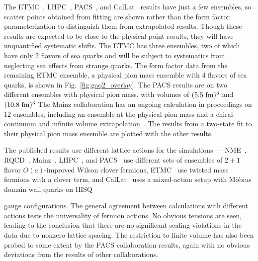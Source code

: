 The ETMC~\cite{Alexandrou:2020okk}, LHPC~\cite{Hasan:2017wwt},
 PACS~\cite{Ishikawa:2018rew,Shintani:2018ozy,Ishikawa:2021eut}, and CalLat~\cite{Meyer:2021vfq}
 results have just a few ensembles, so scatter points obtained from fitting
 are shown rather than the form factor parameterization to distinguish
 them from extrapolated results.
Though these results are expected to be close to the physical point results,
 they will have unquantified systematic shifts.
The ETMC has three ensembles, two of which have only 2 flavors of sea quarks
 and will be subject to systematics from neglecting sea effects from strange quarks.
The form factor data from the remaining ETMC ensemble,
 a physical pion mass ensemble with 4 flavors of sea quarks,
 is shown in Fig.~\ref{fig:gaq2_overlay}.
The PACS results are on two different ensembles with physical pion mass,
 with volumes of $(5.5~{\rm fm})^3$ and $(10.8~{\rm fm})^3$
The Mainz collaboration has an ongoing calculation in proceedings on 12 ensembles,
 including an ensemble at the physical pion mass
 and a chiral-continuum and infinite volume extrapolation~\cite{Djukanovic:2021yqg}.
The results from a two-state fit to their physical pion mass ensemble
 are plotted with the other results.


The published results use different lattice actions for the simulations ---
 NME~\cite{Park:2021ypf}, RQCD~\cite{RQCD:2019jai}, Mainz~\cite{Djukanovic:2021yqg},
 LHPC~\cite{Hasan:2017wwt}, and PACS~\cite{Ishikawa:2018rew,Shintani:2018ozy,Ishikawa:2021eut}
 use different sets of ensembles of $2+1$ flavor $O(a)$-improved Wilson clover fermions,
 ETMC~\cite{Alexandrou:2020okk} use twisted mass fermions with a clover term,
 and CalLat~\cite{Meyer:2021vfq} uses a mixed-action setup with M\"obius domain wall quarks
 on HISQ~\cite{MILC:2012znn}%
 \begin{marginnote}
 \end{marginnote}%
 gauge configurations.
The general agreement between calculations with different actions tests
 the universality of fermion actions.
No obvious tensions are seen,
 leading to the conclusion that there are no significant scaling violations
 in the data due to nonzero lattice spacing.
The restriction to finite volume has also been probed to some extent by
 the PACS collaboration results, %
 again with no obvious deviations from the results of other collaborations.

